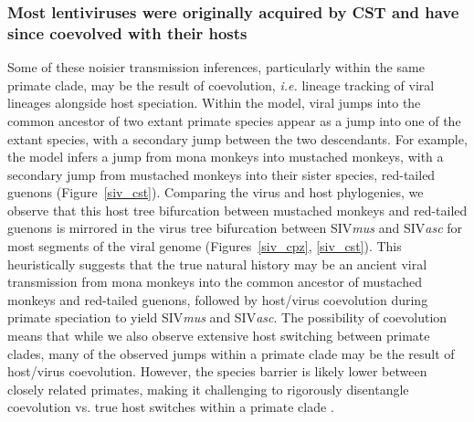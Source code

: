 \subsubsection*{Most lentiviruses were originally acquired by CST and have since coevolved with their hosts}
Some of these noisier transmission inferences, particularly within the same primate clade, may be the result of coevolution, \textit{i.e.} lineage tracking of viral lineages alongside host speciation.
Within the model, viral jumps into the common ancestor of two extant primate species appear as a jump into one of the extant species, with a secondary jump between the two descendants.
For example, the model infers a jump from mona monkeys into mustached monkeys, with a secondary jump from mustached monkeys into their sister species, red-tailed guenons (Figure~\ref{siv_cst}).
Comparing the virus and host phylogenies, we observe that this host tree bifurcation between mustached monkeys and red-tailed guenons is mirrored in the virus tree bifurcation between SIV\textit{mus} and SIV\textit{asc} for most segments of the viral genome (Figures~\ref{siv_cpz}, \ref{siv_cst}).
This heuristically suggests that the true natural history may be an ancient viral transmission from mona monkeys into the common ancestor of mustached monkeys and red-tailed guenons, followed by host/virus coevolution during primate speciation to yield SIV\textit{mus} and SIV\textit{asc}.
The possibility of coevolution means that while we also observe extensive host switching between primate clades, many of the observed jumps within a primate clade may be the result of host/virus coevolution.
However, the species barrier is likely lower between closely related primates, making it challenging to rigorously disentangle coevolution vs. true host switches within a primate clade \citep{charleston2002preferential}.

